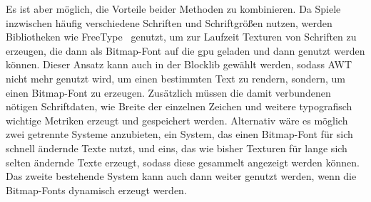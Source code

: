 Es ist aber möglich, die Vorteile beider Methoden zu kombinieren. Da Spiele inzwischen häufig verschiedene Schriften und Schriftgrößen nutzen, werden Bibliotheken wie FreeType~\cite{TheFreeTypeProject,Vries2020} genutzt, um zur Laufzeit Texturen von Schriften zu erzeugen, die dann als Bitmap-Font auf die \ac{gpu} geladen und dann genutzt werden können. Dieser Ansatz kann auch in der Blocklib gewählt werden, sodass AWT nicht mehr genutzt wird, um einen bestimmten Text zu rendern, sondern, um einen Bitmap-Font zu erzeugen. Zusätzlich müssen die damit verbundenen nötigen Schriftdaten, wie Breite der einzelnen Zeichen und weitere typografisch wichtige Metriken erzeugt und gespeichert werden. Alternativ wäre es möglich zwei getrennte Systeme anzubieten, ein System, das einen Bitmap-Font für sich schnell ändernde Texte nutzt, und eins, das wie bisher Texturen für lange sich selten ändernde Texte erzeugt, sodass diese gesammelt angezeigt werden können. Das zweite bestehende System kann auch dann weiter genutzt werden, wenn die Bitmap-Fonts dynamisch erzeugt werden.